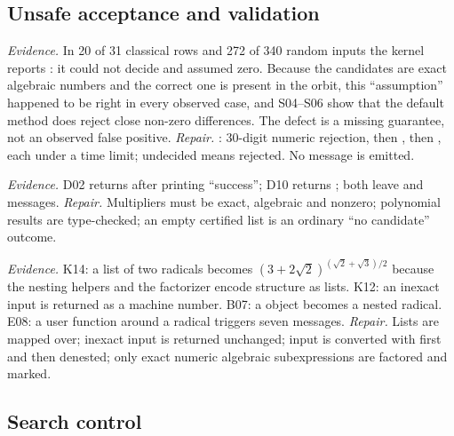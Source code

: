 \subsection{Unsafe acceptance and validation}

\emph{Evidence.} In 20 of 31 classical rows and 272 of 340 random inputs
the kernel reports : it could not decide and
assumed zero. Because the candidates are exact algebraic numbers and the
correct one is present in the orbit, this ``assumption'' happened to be right
in every observed case, and S04--S06 show that the default method does reject
close non-zero differences. The defect is a missing guarantee, not an
observed false positive. \emph{Repair.} : 30-digit
numeric rejection, then , then
, each under a time limit;
undecided means rejected. No message is emitted.

\emph{Evidence.} D02 returns \code{{}[[1]]} after printing ``success'';
D10 returns ; both leave  and
 messages. \emph{Repair.} Multipliers must be exact,
algebraic and nonzero; polynomial results are type-checked; an empty
certified list is an ordinary ``no candidate'' outcome.

\emph{Evidence.} K14: a list of two radicals becomes
$(3+2\sqrt2)^{(\sqrt2+\sqrt3)/2}$ because the nesting helpers and the factorizer
encode structure as lists. K12: an inexact input is returned as a machine
number. B07: a  object becomes a nested radical. E08: a user
function around a radical triggers seven messages. \emph{Repair.} Lists are
mapped over; inexact input is returned unchanged;  input is
converted with  first and then denested; only exact numeric
algebraic subexpressions are factored and marked.

\subsection{Search control}

